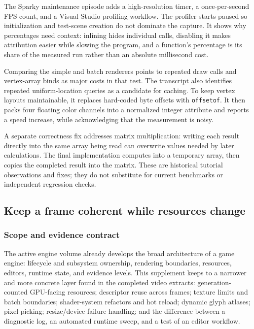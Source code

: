 The Sparky maintenance episode adds a high-resolution timer, a once-per-second FPS count, and a Visual Studio profiling workflow. The profiler starts paused so initialization and test-scene creation do not dominate the capture. It shows why percentages need context: inlining hides individual calls, disabling it makes attribution easier while slowing the program, and a function's percentage is its share of the measured run rather than an absolute millisecond cost.

Comparing the simple and batch renderers points to repeated draw calls and vertex-array binds as major costs in that test. The transcript also identifies repeated uniform-location queries as a candidate for caching. To keep vertex layouts maintainable, it replaces hard-coded byte offsets with \texttt{offsetof}. It then packs four floating color channels into a normalized integer attribute and reports a speed increase, while acknowledging that the measurement is noisy.

A separate correctness fix addresses matrix multiplication: writing each result directly into the same array being read can overwrite values needed by later calculations. The final implementation computes into a temporary array, then copies the completed result into the matrix. These are historical tutorial observations and fixes; they do not substitute for current benchmarks or independent regression checks.

\subsection{Keep a frame coherent while resources change}\label{keep-a-frame-coherent-while-resources-change}

\subsubsection{Scope and evidence contract}\label{scope-and-evidence-contract}

The active engine volume already develops the broad architecture of a game engine: lifecycle and subsystem ownership, rendering boundaries, resources, editors, runtime state, and evidence levels. This supplement keeps to a narrower and more concrete layer found in the completed video extracts: generation-counted GPU-facing resources; descriptor reuse across frames; texture limits and batch boundaries; shader-system refactors and hot reload; dynamic glyph atlases; pixel picking; resize/device-failure handling; and the difference between a diagnostic log, an automated runtime sweep, and a test of an editor workflow.

